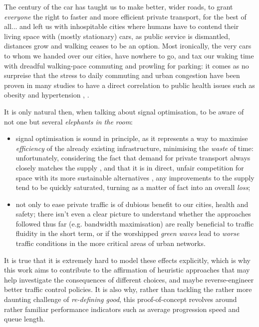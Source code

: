 The century of the car has taught us to make better, wider roads, to grant \emph{everyone} the right to faster and more efficient private transport, for the best of all... and left us with inhospitable cities where humans have to contend their living space with (mostly stationary) cars, as public service is dismantled, distances grow and walking ceases to be an option.
Most ironically, the very cars to whom we handed over our cities, have nowhere to go, and tax our waking time with dreadful walking-pace commuting and prowling for parking: it comes as no surpreise that the stress to daily commuting and urban congestion have been proven in many studies to have a direct correlation to public health issues such as obesity and hypertension \citep{ewing2008relationship}, \citep{lopez2004urban}.

It is only natural then, when talking about signal optimisation, to be aware of not one but several \emph{elephants in the room}:
\begin{itemize}
\item signal optimisation is sound in principle, as it represents a way to maximise \emph{efficiency} of the already existing infrastructure, minimising the \emph{waste} of time: unfortunately, considering the fact that demand for private transport always closely matches the supply \citep{linda2003can}, and that it is in direct, unfair competition for space with its more sustainable alternatives \citep{winston2000government}, any improvements to the supply tend to be quickly saturated, turning as a matter of fact into an overall \emph{loss};
\item not only to ease private traffic is of dubious benefit to our cities, health and safety; there isn't even a clear picture to understand whether the approaches followed thus far (e.g. bandwidth maximisation) are really beneficial to traffic fluidity in the short term, or if the worshipped \emph{green waves} lead to \emph{worse} traffic conditions in the more critical areas of urban networks.
\end{itemize}

It is true that it is extremely hard to model these effects explicitly, which is why this work aims to contribute to the affirmation of heuristic approaches that may help investigate the consequences of different choices, and maybe reverse-engineer better traffic control policies. It is also why, rather than tackling the rather more daunting challenge of \emph{re-defining good}, this proof-of-concept revolves around rather familiar performance indicators such as average progression speed and queue length.

